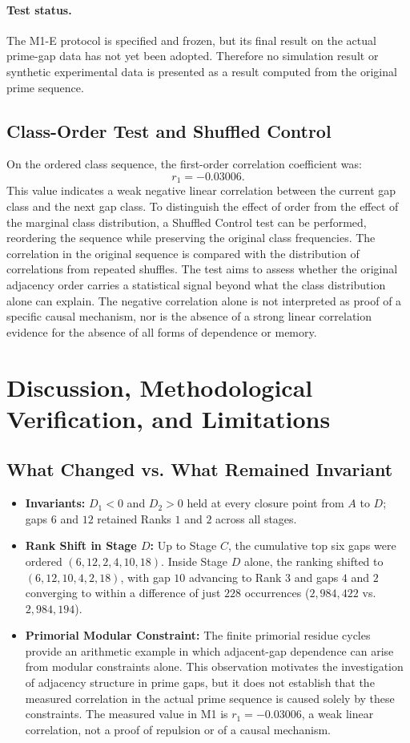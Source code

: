 \documentclass[12pt,a4paper]{article}
\begin{document}
\paragraph{Test status.}
The M1-E protocol is specified and frozen, but its final result on the actual prime-gap data has not yet been adopted. Therefore no simulation result or synthetic experimental data is presented as a result computed from the original prime sequence.
\subsection{Class-Order Test and Shuffled Control}
On the ordered class sequence, the first-order correlation coefficient was:
\[
r_1=-0.03006.
\]
This value indicates a weak negative linear correlation between the current gap class and the next gap class. To distinguish the effect of order from the effect of the marginal class distribution, a Shuffled Control test can be performed, reordering the sequence while preserving the original class frequencies.
The correlation in the original sequence is compared with the distribution of correlations from repeated shuffles. The test aims to assess whether the original adjacency order carries a statistical signal beyond what the class distribution alone can explain.
The negative correlation alone is not interpreted as proof of a specific causal mechanism, nor is the absence of a strong linear correlation evidence for the absence of all forms of dependence or memory.

\section{Discussion, Methodological Verification, and Limitations}
\subsection{What Changed vs. What Remained Invariant}
\begin{itemize}
\item \textbf{Invariants:} $D_1 < 0$ and $D_2 > 0$ held at every closure point from $A$ to $D$; gaps $6$ and $12$ retained Ranks $1$ and $2$ across all stages.
\item \textbf{Rank Shift in Stage $D$:} Up to Stage $C$, the cumulative top six gaps were ordered $(6, 12, 2, 4, 10, 18)$. Inside Stage $D$ alone, the ranking shifted to $(6, 12, 10, 4, 2, 18)$, with gap $10$ advancing to Rank $3$ and gaps $4$ and $2$ converging to within a difference of just $228$ occurrences ($2{,}984{,}422$ vs. $2{,}984{,}194$).
\item \textbf{Primorial Modular Constraint:} The finite primorial residue cycles provide an arithmetic example in which adjacent-gap dependence can arise from modular constraints alone. This observation motivates the investigation of adjacency structure in prime gaps, but it does not establish that the measured correlation in the actual prime sequence is caused solely by these constraints. The measured value in M1 is $r_1 = -0.03006$, a weak linear correlation, not a proof of repulsion or of a causal mechanism.
\end{itemize}
\end{document}
